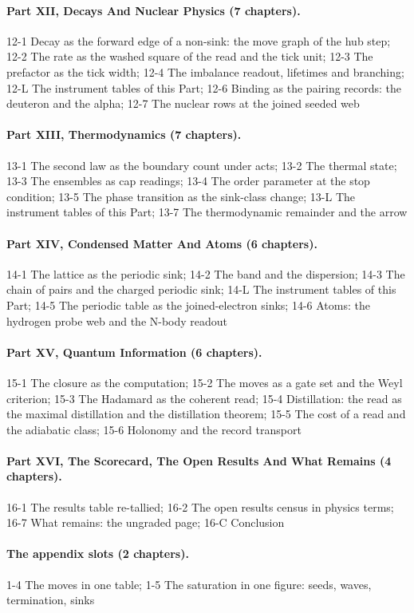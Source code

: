 \paragraph{Part XII, Decays And Nuclear Physics (7 chapters).} 12-1 Decay as the forward edge of a non-sink: the move graph of the hub step; 12-2 The rate as the washed square of the read and the tick unit; 12-3 The prefactor as the tick width; 12-4 The imbalance readout, lifetimes and branching; 12-L The instrument tables of this Part; 12-6 Binding as the pairing records: the deuteron and the alpha; 12-7 The nuclear rows at the joined seeded web
\paragraph{Part XIII, Thermodynamics (7 chapters).} 13-1 The second law as the boundary count under acts; 13-2 The thermal state; 13-3 The ensembles as cap readings; 13-4 The order parameter at the stop condition; 13-5 The phase transition as the sink-class change; 13-L The instrument tables of this Part; 13-7 The thermodynamic remainder and the arrow
\paragraph{Part XIV, Condensed Matter And Atoms (6 chapters).} 14-1 The lattice as the periodic sink; 14-2 The band and the dispersion; 14-3 The chain of pairs and the charged periodic sink; 14-L The instrument tables of this Part; 14-5 The periodic table as the joined-electron sinks; 14-6 Atoms: the hydrogen probe web and the N-body readout
\paragraph{Part XV, Quantum Information (6 chapters).} 15-1 The closure as the computation; 15-2 The moves as a gate set and the Weyl criterion; 15-3 The Hadamard as the coherent read; 15-4 Distillation: the read as the maximal distillation and the distillation theorem; 15-5 The cost of a read and the adiabatic class; 15-6 Holonomy and the record transport
\paragraph{Part XVI, The Scorecard, The Open Results And What Remains (4 chapters).} 16-1 The results table re-tallied; 16-2 The open results census in physics terms; 16-7 What remains: the ungraded page; 16-C Conclusion
\paragraph{The appendix slots (2 chapters).} 1-4 The moves in one table; 1-5 The saturation in one figure: seeds, waves, termination, sinks
